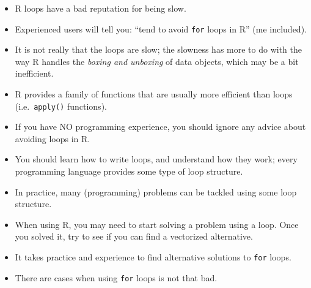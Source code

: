 \documentclass[
]{book}
\begin{document}
\begin{itemize}
\item
  R loops have a bad reputation for being slow.
\item
  Experienced users will tell you: ``tend to avoid \texttt{for} loops in R'' (me included).
\item
  It is not really that the loops are slow; the slowness has more to do with
  the way R handles the \emph{boxing and unboxing} of data objects, which may be a bit
  inefficient.
\item
  R provides a family of functions that are usually more efficient than loops
  (i.e.~\texttt{apply()} functions).
\item
  If you have NO programming experience, you should ignore any advice about
  avoiding loops in R.
\item
  You should learn how to write loops, and understand how they work; every
  programming language provides some type of loop structure.
\item
  In practice, many (programming) problems can be tackled using some loop structure.
\item
  When using R, you may need to start solving a problem using a loop. Once you
  solved it, try to see if you can find a vectorized alternative.
\item
  It takes practice and experience to find alternative solutions to \texttt{for} loops.
\item
  There are cases when using \texttt{for} loops is not that bad.
\end{itemize}

  
\end{document}
